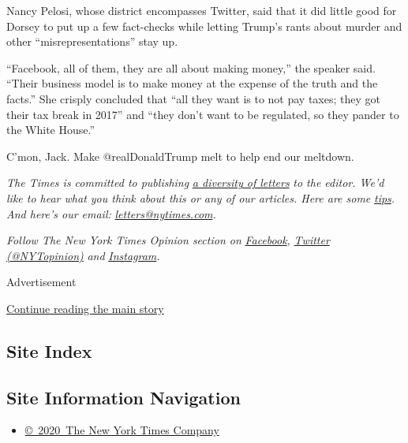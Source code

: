 Nancy Pelosi, whose district encompasses Twitter, said that it did
little good for Dorsey to put up a few fact-checks while letting Trump's
rants about murder and other ``misrepresentations'' stay up.

``Facebook, all of them, they are all about making money,'' the speaker
said. ``Their business model is to make money at the expense of the
truth and the facts.'' She crisply concluded that ``all they want is to
not pay taxes; they got their tax break in 2017'' and ``they don't want
to be regulated, so they pander to the White House.''

C'mon, Jack. Make @realDonaldTrump melt to help end our meltdown.

\emph{The Times is committed to publishing}
\href{https://www.nytimes.com/2019/01/31/opinion/letters/letters-to-editor-new-york-times-women.html}{\emph{a
diversity of letters}} \emph{to the editor. We'd like to hear what you
think about this or any of our articles. Here are some}
\href{https://help.nytimes.com/hc/en-us/articles/115014925288-How-to-submit-a-letter-to-the-editor}{\emph{tips}}\emph{.
And here's our email:}
\href{mailto:letters@nytimes.com}{\emph{letters@nytimes.com}}\emph{.}

\emph{Follow The New York Times Opinion section on}
\href{https://www.facebook.com/nytopinion}{\emph{Facebook}}\emph{,}
\href{http://twitter.com/NYTOpinion}{\emph{Twitter (@NYTopinion)}}
\emph{and}
\href{https://www.instagram.com/nytopinion/}{\emph{Instagram}}\emph{.}

Advertisement

\protect\hyperlink{after-bottom}{Continue reading the main story}

\hypertarget{site-index}{%
\subsection{Site Index}\label{site-index}}

\hypertarget{site-information-navigation}{%
\subsection{Site Information
Navigation}\label{site-information-navigation}}

\begin{itemize}
\tightlist
\item
  \href{https://help.nytimes.com/hc/en-us/articles/115014792127-Copyright-notice}{©~2020~The
  New York Times Company}
\end{itemize}

